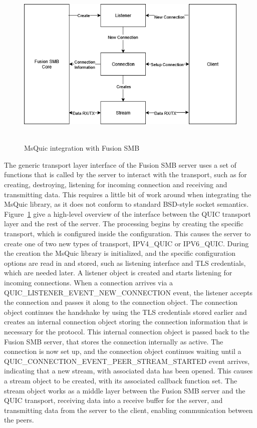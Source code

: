 \documentclass[english, 12pt, a4paper, elec, utf8, a-2b, online]{aaltothesis}
\begin{document}
\begin{figure}[h]
	\centering
	\includegraphics[alt={Block diagram of the flow between Fusion SMB and MsQuic}, height=7.4cm]{./images/MsQuic_integration.png}
	\caption{MsQuic integration with Fusion SMB}
	\label{fig:msquic_int}
\end{figure}

The generic transport layer interface of the Fusion SMB server uses a set of functions
that is called by the server to interact with the transport, such as for creating,
destroying, listening for incoming connection and receiving and transmitting data.
This requires a little bit of work around when integrating the MsQuic library, as
it does not conform to standard BSD-style socket semantics. Figure~\ref{fig:msquic_int}
give a high-level overview of the interface between the QUIC transport layer and the
rest of the server. The processing begins by creating the specific transport, which
is configured inside the configuration. This causes the server to create one of two
new types of transport, IPV4\_QUIC or IPV6\_QUIC. During the creation the MsQuic
library is initialized, and the specific configuration options are read in and stored,
such as listening interface and TLS credentials, which are needed later. A listener
object is created and starts listening for incoming connections. When a connection
arrives via a QUIC\_LISTENER\_EVENT\_NEW\_CONNECTION event, the listener accepts the connection and passes it along to the
connection object. The connection object continues the handshake by using the TLS
credentials stored earlier and creates an internal connection object storing
the connection information that is necessary for the protocol. This internal connection
object is passed back to the Fusion SMB server, that stores the connection internally
as active. The connection is now set up, and the connection object continues waiting
until a QUIC\_CONNECTION\_EVENT\_PEER\_STREAM\_STARTED event arrives, indicating
that a new stream, with associated data has been opened. This causes a stream object
to be created, with its associated callback function set. The stream object works
as a middle layer between the Fusion SMB server and the QUIC transport, receiving
data into a receive buffer for the server, and transmitting data from the server to
the client, enabling communication between the peers.
\end{document}
